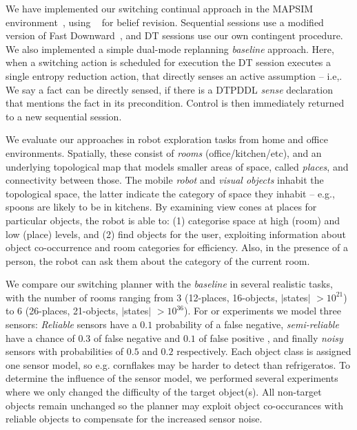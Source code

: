 
We have implemented our switching continual approach in the MAPSIM
environment~\cite{brenner:nebel:jaamas09},
using ~\cite{king:2009} for belief
revision. Sequential sessions use a modified version of Fast
Downward~\cite{fast-downward}, and DT sessions use our own contingent
procedure. We also implemented a simple dual-mode replanning {\em
baseline} approach. Here, when a switching action is scheduled for
execution the DT session executes a single entropy reduction action,
that directly senses an active assumption -- i.e,. We say a fact can
be directly sensed, if there is a DTPDDL {\em sense} declaration that
mentions the fact in its precondition.  Control is then immediately
returned to a new sequential session.


We evaluate our approaches in robot exploration tasks from home and
office environments. Spatially, these consist of {\em rooms}
(office/kitchen/etc), and an underlying topological map that models
smaller areas of space, called {\em places}, and connectivity between
those. The mobile {\em robot} and {\em visual objects} inhabit the
topological space, the latter indicate the category of space they
inhabit -- e.g., spoons are likely to be in kitchens. By examining
view cones at places for particular objects, the robot is able to: (1)
categorise space at high (room) and low (place) levels, and (2) find
objects for the user, exploiting information about object
co-occurrence and room categories for efficiency. Also, in the
presence of a person, the robot can ask them about the category of the
current room.


We compare our switching planner with the {\em baseline} in several
realistic tasks, with the number of rooms ranging from 3 (12-places,
16-objects, $|$states$|$ $>10^{21}$) to 6 (26-places, 21-objects,
$|$states$|$ $>10^{36}$). For or experiments we model three sensors:
{\em Reliable} sensors have a $0.1$ probability of a false negative,
{\em semi-reliable} have a chance of $0.3$ of false negative and $0.1$
of false positive , and finally {\em noisy} sensors with probabilities
of $0.5$ and $0.2$ respectively. Each object class is assigned one
sensor model, so e.g. cornflakes may be harder to detect than
refrigeratos. To determine the influence of the sensor model, we
performed several experiments where we only changed the difficulty of
the target object(s). All non-target objects remain unchanged so the
planner may exploit object co-occurances with reliable objects to
compensate for the increased sensor noise.

